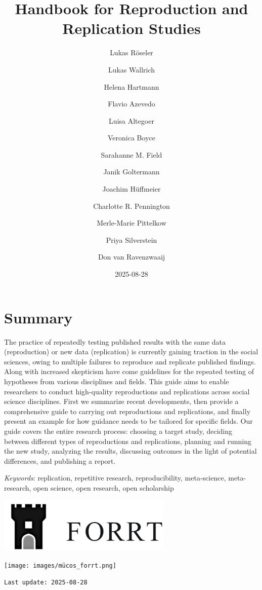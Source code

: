 \documentclass[
  letterpaper,
  DIV=11,
  openany,
  fontsize=12pt,
  parskip=half,
  headings=big,
  numbers=noenddot,
  titlepage=false]{scrreprt}
\title{Handbook for Reproduction and Replication Studies}
\author{Lukas Röseler \and Lukas Wallrich \and Helena
Hartmann \and Flavio Azevedo \and Luisa Altegoer \and Veronica
Boyce \and Sarahanne M. Field \and Janik Goltermann \and Joachim
Hüffmeier \and Charlotte R. Pennington \and Merle-Marie
Pittelkow \and Priya Silverstein \and Don van Ravenzwaaij}
\date{2025-08-28}
\renewcommand{\maketitle}{} %
\renewcommand*\contentsname{Table of contents}
\newcommand\contentsname{Table of contents}
\begin{document}
\maketitle

\renewcommand*\contentsname{Table of contents}
{
\hypersetup{linkcolor=}
\setcounter{tocdepth}{2}
\tableofcontents
}


\chapter*{Summary}\label{abstract}


The practice of repeatedly testing published results with the same data
(reproduction) or new data (replication) is currently gaining traction
in the social sciences, owing to multiple failures to reproduce and
replicate published findings. Along with increased skepticism have come
guidelines for the repeated testing of hypotheses from various
disciplines and fields. This guide aims to enable researchers to conduct
high-quality reproductions and replications across social science
disciplines. First we summarize recent developments, then provide a
comprehensive guide to carrying out reproductions and replications, and
finally present an example for how guidance needs to be tailored for
specific fields. Our guide covers the entire research process: choosing
a target study, deciding between different types of reproductions and
replications, planning and running the new study, analyzing the results,
discussing outcomes in the light of potential differences, and
publishing a report.

\emph{Keywords}: replication, repetitive research, reproducibility,
meta-science, meta-research, open science, open research, open
scholarship

\includegraphics[width=3.29167in,height=\textheight,keepaspectratio]{images/clipboard-410410403.png}

\texttt{[image: images/mücos\_forrt.png]}

\begin{verbatim}
Last update: 2025-08-28
\end{verbatim}
\end{document}
